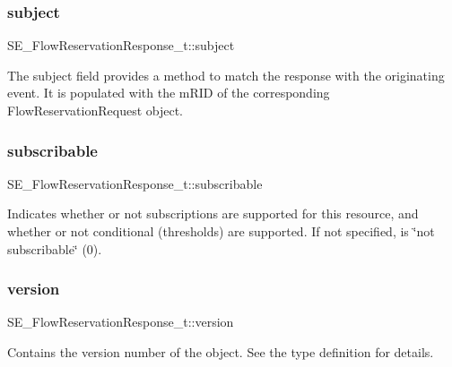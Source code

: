 \subsubsection{\texorpdfstring{subject}{subject}}
{\footnotesize\ttfamily S\+E\+\_\+\+Flow\+Reservation\+Response\+\_\+t\+::subject}

The subject field provides a method to match the response with the originating event. It is populated with the m\+R\+ID of the corresponding Flow\+Reservation\+Request object. \mbox{\label{group__FlowReservationResponse_ga94f00e1c91f5d76b177e210db546cf6b}} 
\subsubsection{\texorpdfstring{subscribable}{subscribable}}
{\footnotesize\ttfamily S\+E\+\_\+\+Flow\+Reservation\+Response\+\_\+t\+::subscribable}

Indicates whether or not subscriptions are supported for this resource, and whether or not conditional (thresholds) are supported. If not specified, is \char`\"{}not subscribable\char`\"{} (0). \mbox{\label{group__FlowReservationResponse_ga4749b6c0f5dbe4bf63f7d62b2e0c698d}} 
\subsubsection{\texorpdfstring{version}{version}}
{\footnotesize\ttfamily S\+E\+\_\+\+Flow\+Reservation\+Response\+\_\+t\+::version}

Contains the version number of the object. See the type definition for details. 